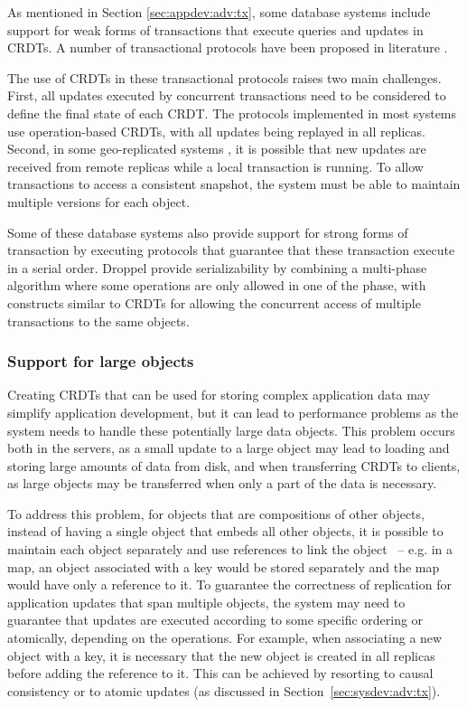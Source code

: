\documentclass[11pt,a4paper]{article}
\begin{document}
As mentioned in Section \ref{sec:appdev:adv:tx}, some database systems
include support for weak forms of transactions that execute queries and
updates in CRDTs.
A number of transactional protocols have been proposed in literature
\cite{swiftcloud,Akkoorath16Cure,Sovran11Transactional}.

The use of CRDTs in these transactional protocols raises two main challenges.
First, all updates executed by concurrent transactions need to be 
considered to define the final state of each CRDT. 
The protocols implemented in most systems 
\cite{swiftcloud,Akkoorath16Cure,Sovran11Transactional,Li14Automating} use operation-based CRDTs,
with all updates being replayed in all replicas.
Second, in some geo-replicated systems \cite{swiftcloud,Akkoorath16Cure}, 
it is possible that new updates are received from remote replicas while a local transaction is running.
To allow transactions to access a consistent snapshot, the system must
be able to maintain multiple versions for each object.

Some of these database systems \cite{Sovran11Transactional,Li14Automating} 
also provide support for strong forms of
transaction by executing protocols that guarantee that these transaction execute
in a serial order.
Droppel \cite{droppel} provide serializability by combining a multi-phase 
algorithm where some operations are only allowed in one of the phase, 
with constructs similar to CRDTs for allowing 
the concurrent access of multiple transactions to the same objects.

\subsubsection{Support for large objects}

Creating CRDTs that can be used for storing complex application data 
may simplify application development, but it can lead to performance
problems as the system needs to handle these potentially  
large data objects.
This problem occurs both in the servers, as a small update to a 
large object may lead to loading and storing large amounts of data
from disk, and when transferring CRDTs to clients, as large objects
may be transferred when only a part of the data is necessary.

To address this problem, for objects that are compositions of
other objects, instead of having a single object that embeds all other
objects, it is possible to maintain each object separately and use references 
to link the object~\cite{Meiklejohn14Composability} -- e.g. in a map, an object 
associated with a key would be stored separately and the map would have 
only a reference to it.
To guarantee the correctness of replication for application updates that 
span multiple objects, the system may need to guarantee that updates are
executed according to some specific ordering or atomically, depending 
on the operations. 
For example, when associating a new object with a key, it is necessary that
the new object is created in all replicas before adding the reference to 
it. This can be achieved by resorting to causal 
consistency \cite{cops,chainreaction,swiftcloud} or to atomic updates (as discussed 
in Section~\ref{sec:sysdev:adv:tx}).
\end{document}
